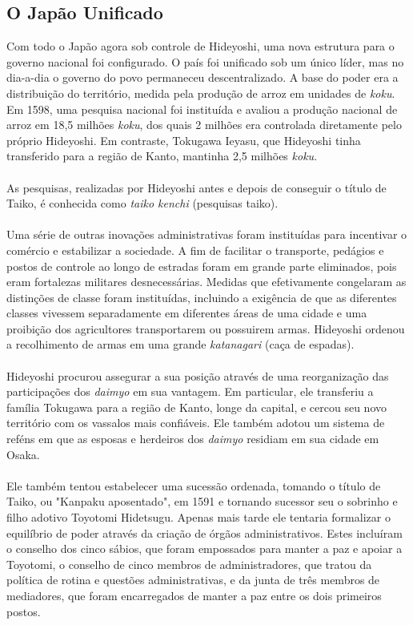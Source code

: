 \documentclass[12pt, a4paper]{article}
\begin{document}
        \subsection {O Japão Unificado}
            Com todo o Japão agora sob controle de Hideyoshi, uma nova estrutura para o governo nacional foi configurado. O país foi unificado sob um único líder, mas no dia-a-dia o governo do povo permaneceu descentralizado. A base do poder era a distribuição do território, medida pela produção de arroz em unidades de \textit{koku}. Em 1598, uma pesquisa nacional foi instituída e avaliou a produção nacional de arroz em 18,5 milhões \textit{koku}, dos quais 2 milhões era controlada diretamente pelo próprio Hideyoshi. Em contraste, Tokugawa Ieyasu, que Hideyoshi tinha transferido para a região de Kanto, mantinha 2,5 milhões \textit{koku}.\\
            \\
            \indent As pesquisas, realizadas por Hideyoshi antes e depois de conseguir o título de Taiko, é conhecida como \textit{taiko kenchi}  (pesquisas taiko).\\
            \\
            \indent Uma série de outras inovações administrativas foram instituídas para incentivar o comércio e estabilizar a sociedade. A fim de facilitar o transporte, pedágios e postos de controle ao longo de estradas foram em grande parte eliminados, pois eram fortalezas militares desnecessárias. Medidas que efetivamente congelaram as distinções de classe foram instituídas, incluindo a exigência de que as diferentes classes vivessem separadamente em diferentes áreas de uma cidade e uma proibição dos agricultores transportarem ou possuirem armas. Hideyoshi ordenou a recolhimento de armas em uma grande \textit{katanagari} (caça de espadas).\\
            \\
            \indent Hideyoshi procurou assegurar a sua posição através de uma reorganização das participações dos \textit{daimyo} em sua vantagem. Em particular, ele transferiu a família Tokugawa para a região de Kanto, longe da capital, e cercou seu novo território com os vassalos mais confiáveis. Ele também adotou um sistema de reféns em que as esposas e herdeiros dos \textit{daimyo} residiam em sua cidade em Osaka.\\
            \\
            \indent Ele também tentou estabelecer uma sucessão ordenada, tomando o título de Taiko, ou "Kanpaku aposentado", em 1591 e tornando sucessor seu o sobrinho e filho adotivo Toyotomi Hidetsugu. Apenas mais tarde ele tentaria formalizar o equilíbrio de poder através da criação de órgãos administrativos. Estes incluíram o conselho dos cinco sábios, que foram empossados para manter a paz e apoiar a Toyotomi, o conselho de cinco membros de administradores, que tratou da política de rotina e questões administrativas, e da junta de três membros de mediadores, que foram encarregados de manter a paz entre os dois primeiros postos.\\
\end{document}
